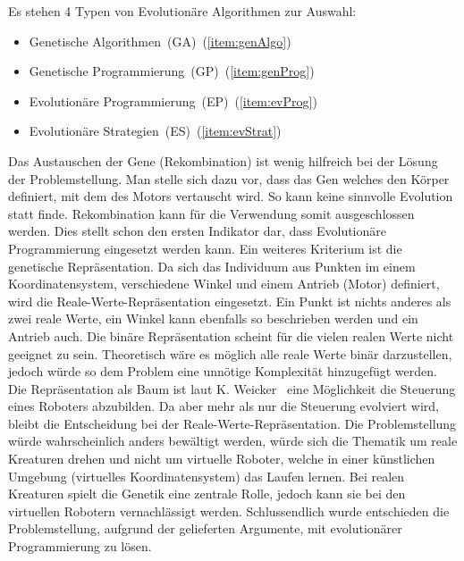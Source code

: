     Es stehen 4 Typen von Evolutionäre Algorithmen zur Auswahl:

    \begin{itemize}
      \item Genetische Algorithmen~(GA)~(\vref{item:genAlgo})
      \item Genetische Programmierung~(GP)~(\vref{item:genProg})
      \item Evolutionäre Programmierung~(EP)~(\vref{item:evProg})
      \item Evolutionäre Strategien~(ES)~(\vref{item:evStrat})
    \end{itemize}

    Das Austauschen der Gene (Rekombination) ist wenig hilfreich bei der Lösung der Problemstellung.
    Man stelle sich dazu vor, dass das Gen welches den Körper definiert, mit dem des Motors vertauscht wird.
    So kann keine sinnvolle Evolution statt finde. Rekombination kann für die Verwendung somit ausgeschlossen werden.
    Dies stellt schon den ersten Indikator dar,
    dass Evolutionäre Programmierung eingesetzt werden kann.
    Ein weiteres Kriterium ist die genetische Repräsentation.
    Da sich das Individuum aus Punkten im einem Koordinatensystem,
    verschiedene Winkel und einem Antrieb (Motor) definiert, wird die Reale-Werte-Repräsentation eingesetzt.
    Ein Punkt ist nichts anderes als zwei reale Werte,
    ein Winkel kann ebenfalls so beschrieben werden und ein Antrieb auch.
    Die binäre Repräsentation scheint für die vielen realen Werte nicht geeignet zu sein.
    Theoretisch wäre es möglich alle reale Werte binär darzustellen, jedoch würde so dem Problem eine unnötige Komplexität hinzugefügt werden.
    Die Repräsentation als Baum ist laut K. Weicker~\cite{book:evAlgo} eine Möglichkeit die Steuerung eines Roboters abzubilden.
    Da aber mehr als nur die Steuerung evolviert wird, bleibt die Entscheidung bei der Reale-Werte-Repräsentation.
    Die Problemstellung würde wahrscheinlich anders bewältigt werden,
    würde sich die Thematik um reale Kreaturen drehen und nicht um virtuelle Roboter,
    welche in einer künstlichen Umgebung (virtuelles Koordinatensystem) das Laufen lernen.
    Bei realen Kreaturen spielt die Genetik eine zentrale Rolle, jedoch kann sie bei den virtuellen Robotern vernachlässigt werden.
    Schlussendlich wurde entschieden die Problemstellung, aufgrund der gelieferten Argumente, mit evolutionärer Programmierung zu lösen.

